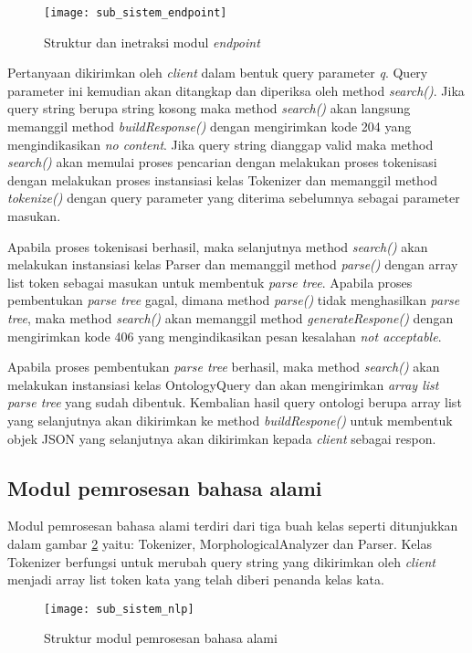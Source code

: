 \begin{figure}[hb]
    \centering
    \texttt{[image: sub\_sistem\_endpoint]}
    \caption{Struktur dan inetraksi modul \emph{endpoint}} 
    \label{fig:sub_sistem_endpoint}
\end{figure}

Pertanyaan dikirimkan oleh \emph{client} dalam bentuk query parameter \emph{q}. Query parameter ini kemudian akan ditangkap dan diperiksa oleh method \emph{search()}. Jika query string berupa string kosong maka method \emph{search()} akan langsung memanggil method \emph{buildResponse()} dengan mengirimkan kode 204 yang mengindikasikan \emph{no content}. Jika query string dianggap valid maka method \emph{search()} akan memulai proses pencarian dengan melakukan proses tokenisasi dengan melakukan proses instansiasi kelas Tokenizer dan memanggil method \emph{tokenize()} dengan query parameter yang diterima sebelumnya sebagai parameter masukan. 

Apabila proses tokenisasi berhasil, maka selanjutnya method \emph{search()} akan melakukan instansiasi kelas Parser dan memanggil method \emph{parse()} dengan array list token sebagai masukan untuk membentuk \emph{parse tree}. Apabila proses pembentukan \emph{parse tree} gagal, dimana method \emph{parse()} tidak menghasilkan \emph{parse tree}, maka method \emph{search()} akan memanggil method \emph{generateRespone()} dengan mengirimkan kode 406 yang mengindikasikan pesan kesalahan \emph{not acceptable}.

Apabila proses pembentukan \emph{parse tree} berhasil, maka method \emph{search()} akan melakukan instansiasi kelas OntologyQuery dan akan mengirimkan \emph{array list parse tree} yang sudah dibentuk. Kembalian hasil query ontologi berupa array list yang selanjutnya akan dikirimkan ke method \emph{buildRespone()} untuk membentuk objek JSON yang selanjutnya akan dikirimkan kepada \emph{client} sebagai respon.


\subsection{Modul pemrosesan bahasa alami}
Modul pemrosesan bahasa alami terdiri dari tiga buah kelas seperti ditunjukkan dalam gambar \ref{fig:sub_sistem_nlp} yaitu: Tokenizer, MorphologicalAnalyzer dan Parser. Kelas Tokenizer berfungsi untuk merubah query string yang dikirimkan oleh \emph{client} menjadi array list token kata yang telah diberi penanda kelas kata.

\begin{figure}[ht]
    \centering
    \texttt{[image: sub\_sistem\_nlp]}
    \caption{Struktur modul pemrosesan bahasa alami} 
    \label{fig:sub_sistem_nlp}
\end{figure}

